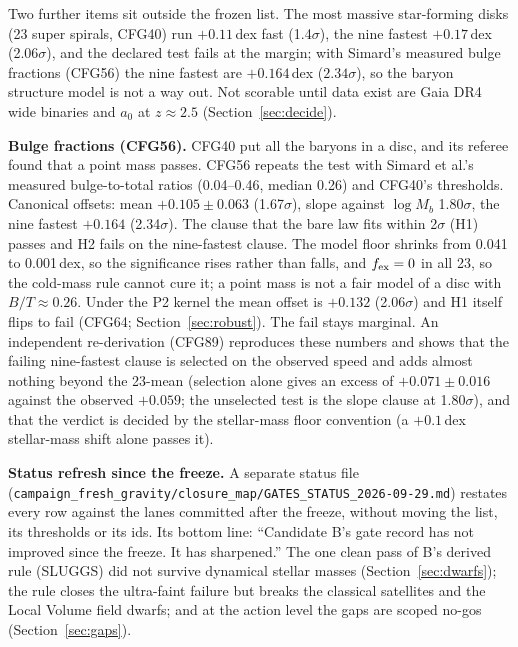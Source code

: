 \documentclass[10pt]{article}
\newcommand{\fpath}[1]{\nolinkurl{#1}}
\begin{document}
Two further items sit outside the frozen list. The most massive star-forming disks (23 super spirals, CFG40) run $+0.11$\,dex fast (1.4$\sigma$), the nine fastest $+0.17$\,dex (2.06$\sigma$), and the declared test fails at the margin; with Simard's measured bulge fractions (CFG56) the nine fastest are $+0.164$\,dex ($2.34\sigma$), so the baryon structure model is not a way out. Not scorable until data exist are Gaia DR4 wide binaries and $a_0$ at $z\approx2.5$ (Section~\ref{sec:decide}).

\textbf{Bulge fractions (CFG56).} CFG40 put all the baryons in a disc, and its referee found that a point mass passes. CFG56 repeats the test with Simard et al.'s measured bulge-to-total ratios (0.04--0.46, median 0.26) and CFG40's thresholds. Canonical offsets: mean $+0.105\pm0.063$ (1.67$\sigma$), slope against $\log M_b$ 1.80$\sigma$, the nine fastest $+0.164$ (2.34$\sigma$). The clause that the bare law fits within 2$\sigma$ (H1) passes and H2 fails on the nine-fastest clause. The model floor shrinks from 0.041 to 0.001\,dex, so the significance rises rather than falls, and $f_{\rm ex}=0$ in all 23, so the cold-mass rule cannot cure it; a point mass is not a fair model of a disc with $B/T\approx0.26$. Under the P2 kernel the mean offset is $+0.132$ (2.06$\sigma$) and H1 itself flips to fail (CFG64; Section~\ref{sec:robust}). The fail stays marginal. An independent re-derivation (CFG89) reproduces these numbers and shows that the failing nine-fastest clause is selected on the observed speed and adds almost nothing beyond the 23-mean (selection alone gives an excess of $+0.071\pm0.016$ against the observed $+0.059$; the unselected test is the slope clause at 1.80$\sigma$), and that the verdict is decided by the stellar-mass floor convention (a $+0.1$\,dex stellar-mass shift alone passes it).

\textbf{Status refresh since the freeze.} A separate status file (\fpath{campaign_fresh_gravity/closure_map/GATES_STATUS_2026-09-29.md}) restates every row against the lanes committed after the freeze, without moving the list, its thresholds or its ids. Its bottom line: ``Candidate B's gate record has not improved since the freeze. It has sharpened.'' The one clean pass of B's derived rule (SLUGGS) did not survive dynamical stellar masses (Section~\ref{sec:dwarfs}); the rule closes the ultra-faint failure but breaks the classical satellites and the Local Volume field dwarfs; and at the action level the gaps are scoped no-gos (Section~\ref{sec:gaps}).
\end{document}
